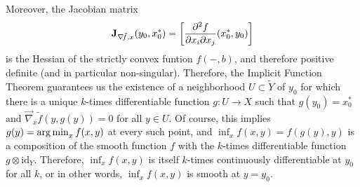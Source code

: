 \begin{lproof}
	Moreover, the Jacobian matrix
	\[ \mathbf{J}_{\nabla\!\tilde f, x}(y_0, x_0^*) = \left[ \frac{\partial^2 f}{\partial x_i \partial x_j}(x^*_0, y_0) \right]\]
	is the Hessian of the strictly convex funtion $f(-, b)$, and therefore positive definite (and in particular non-singular).
	Therefore, the Implicit Function Theorem guarantees us the existence of a neighborhood $U \subset \tilde Y$ of $y_0$ for which
	there is a unique $k$-times differentiable function $g: U \to X$ such that $g(y_0) = x^*_0$ and $\vec\nabla_x \tilde f(y, g(y)) = 0$ for all $y \in U$. Of course, this implies $g(y) = \operatorname*{arg\,min}_x f(x,y)$ at every such point, and $\inf_x f(x,y) = f(g(y),y)$ is a composition of the smooth function $f$ with the $k$-times differentiable function $g \otimes \mathrm{id}_Y$.
	Therefore, $\inf_x f(x,y)$ is itself $k$-times continuously differentiable at $y_0$ for all $k$, or in other words, $\inf_x f(x,y)$ is smooth at $y=y_0$.
\end{lproof}



